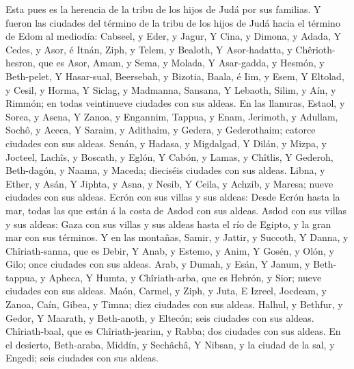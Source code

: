  Esta pues es la herencia de la tribu de los hijos de Judá
por sus familias.  Y fueron las ciudades del término de la
tribu de los hijos de Judá hacia el término de Edom al mediodía:
Cabseel, y Eder, y Jagur,  Y Cina, y Dimona, y Adada,
 Y Cedes, y Asor, é Itnán,  Ziph, y Telem, y
Bealoth,  Y Asor-hadatta, y Chêrioth-hesron, que es Asor,
 Amam, y Sema, y Molada,  Y Asar-gadda, y
Hesmón, y Beth-pelet,  Y Hasar-sual, Beersebah, y Bizotia,
 Baala, é Iim, y Esem,  Y Eltolad, y Cesil, y
Horma,  Y Siclag, y Madmanna, Sansana,  Y
Lebaoth, Silim, y Aín, y Rimmón; en todas veintinueve ciudades con sus
aldeas.  En las llanuras, Estaol, y Sorea, y Asena,
 Y Zanoa, y Engannim, Tappua, y Enam, 
Jerimoth, y Adullam, Sochô, y Aceca,  Y Saraim, y Adithaim,
y Gedera, y Gederothaim; catorce ciudades con sus aldeas. 
Senán, y Hadasa, y Migdalgad,  Y Dilán, y Mizpa, y Jocteel,
 Lachîs, y Boscath, y Eglón,  Y Cabón, y
Lamas, y Chîtlis,  Y Gederoh, Beth-dagón, y Naama, y
Maceda; dieciséis ciudades con sus aldeas.  Libna, y Ether,
y Asán,  Y Jiphta, y Asna, y Nesib,  Y Ceila,
y Achzib, y Maresa; nueve ciudades con sus aldeas.  Ecrón
con sus villas y sus aldeas:  Desde Ecrón hasta la mar,
todas las que están á la costa de Asdod con sus aldeas. 
Asdod con sus villas y sus aldeas: Gaza con sus villas y sus aldeas
hasta el río de Egipto, y la gran mar con sus términos.  Y
en las montañas, Samir, y Jattir, y Succoth,  Y Danna, y
Chîriath-sanna, que es Debir,  Y Anab, y Estemo, y Anim,
 Y Gosén, y Olón, y Gilo; once ciudades con sus aldeas.
 Arab, y Dumah, y Esán,  Y Janum, y
Beth-tappua, y Apheca,  Y Humta, y Chîriath-arba, que es
Hebrón, y Sior; nueve ciudades con sus aldeas.  Maón,
Carmel, y Ziph, y Juta,  E Izreel, Jocdeam, y Zanoa,
 Caín, Gibea, y Timna; diez ciudades con sus aldeas.
 Halhul, y Bethfur, y Gedor,  Y Maarath, y
Beth-anoth, y Eltecón; seis ciudades con sus aldeas. 
Chîriath-baal, que es Chîriath-jearim, y Rabba; dos ciudades con sus
aldeas.  En el desierto, Beth-araba, Middín, y Sechâchâ,
 Y Nibsan, y la ciudad de la sal, y Engedi; seis ciudades
con sus aldeas.

